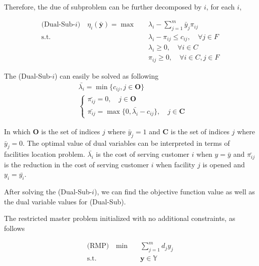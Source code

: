             Therefore, the due of subproblem can be further decomposed by $i$, for each $i$,

            \begin{align*}
                \text{(Dual-Sub-$i$)} \quad \eta_i(\bar{\mathbf{y}}) = \max \quad & \lambda_i - \sum_{j = 1}^m \bar{y}_j \pi_{ij}\\
                \text{s.t.} \quad & \lambda_i - \pi_{ij} \le c_{ij}, \quad \forall j \in F\\
                & \lambda_i \ge 0, \quad \forall i \in C\\
                & \pi_{ij} \ge 0, \quad \forall i \in C, j \in F
            \end{align*}

            The (Dual-Sub-$i$) can easily be solved as following
            \begin{align*}
                &\bar{\lambda_i} = \min \{c_{ij}, j \in \mathbf{O}\}\\
                &\begin{cases}
                    \bar{\pi_{ij}} = 0, \quad j \in \mathbf{O}\\
                    \bar{\pi_{ij}} = \max \{0, \bar{\lambda_i} - c_{ij}\}, \quad j \in \mathbf{C}
                \end{cases}
            \end{align*}

            In which $\mathbf{O}$ is the set of indices $j$ where $\bar{y}_j = 1$ and $\mathbf{C}$ is the set of indices $j$ where $\bar{y}_j = 0$. The optimal value of dual variables can be interpreted in terms of facilities location problem. $\bar{\lambda_i}$ is the cost of serving customer $i$ when $y = \bar{y}$ and $\bar{\pi_{ij}}$ is the reduction in the cost of serving customer $i$ when facility $j$ is opened and $y_i = \bar{y_i}$.

            After solving the (Dual-Sub-$i$), we can find the objective function value as well as the dual variable values for (Dual-Sub). 

            The restricted master problem initialized with no additional constraints, as follows

            \begin{align*}
                \text{(RMP)} \quad \min \quad & \sum_{j = 1}^m d_j y_j\\
                \text{s.t.} \quad & \mathbf{y} \in \mathbb{Y}
            \end{align*}

